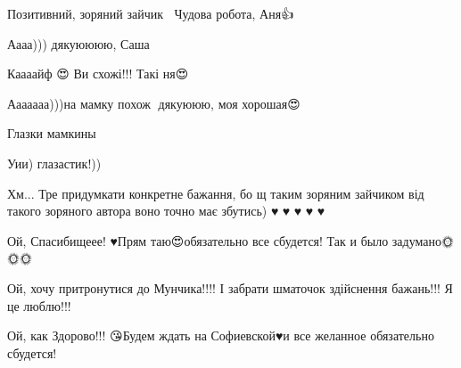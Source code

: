 
 
 
 
 

\qqSecCmt


Позитивний, зоряний зайчик🐰😁 Чудова робота, Аня👍

\begin{itemize} %

Аааа))) дякуюююю, Саша🤗🤗🤗🤗
\end{itemize} %


Каааайф 😍 Ви схожі!!! Такі ня😍

\begin{itemize} %

Ааааааа)))на мамку похож 🤗дякуююю, моя хорошая😍


Глазки мамкины 👀😍


Уии) глазастик!))🤗😘

\end{itemize} %


Хм... Тре придумкати конкретне бажання, бо щ таким зоряним зайчиком від такого
зоряного автора воно точно має збутись) ♥ ♥ ♥ ♥ ♥

\begin{itemize} %

Ой, Спасибищеее! ♥️Прям таю😍обязательно все сбудется! Так и было задумано🌞🌞🌞
\end{itemize} %


Ой, хочу притронутися до Мунчика!!!! І забрати шматочок здійснення бажань!!! Я
це люблю!!!

\begin{itemize} %

Ой, как Здорово!!! 😘Будем ждать на Софиевской♥️и все желанное обязательно сбудется!
\end{itemize} %

